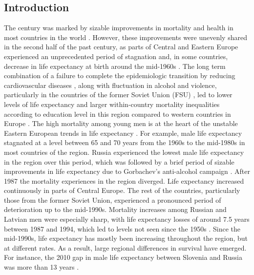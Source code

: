\documentclass{article}
\begin{document}
\begin{spacing}{1.5}
\section*{Introduction}
The  century was marked by sizable improvements in mortality and health in most countries in the world \citep{who2000}. However, these improvements were unevenly shared in the second half of the past century, as parts of Central and Eastern Europe experienced an unprecedented period of stagnation and, in some countries, decrease in life expectancy at birth around  the mid-1960s \citep{HMD}. The long term combination of a failure to complete the epidemiologic transition by reducing cardiovascular diseases \citep{caselli2002epidemiologic}, along with fluctuation in alcohol and violence, particularly in the countries of the former Soviet Union (FSU) \citep{bye2008alcohol,leon1997huge}, led to lower levels of life expectancy and larger within-country mortality inequalities according to education level in this region compared to western countries in Europe \citep{mackenbach2008socioeconomic}. The high mortality among young men is at the heart of the unstable Eastern European trends in life expectancy \citep{mckee2001}. For example, male life expectancy stagnated at a level between 65 and 70 years from the 1960s to the mid-1980s in most countries of the region. Russia experienced the lowest male life expectancy in the region over this period, which was followed by a brief period of sizable improvements in life expectancy due to Gorbachev's anti-alcohol campaign \citep{leon1998social}. After 1987 the mortality experiences in the region diverged. Life expectancy increased continuously in parts of Central Europe. The rest of the countries, particularly those from the former Soviet Union, experienced a pronounced period of deterioration up to the mid-1990s. Mortality increases among Russian and Latvian men were especially sharp, with life expectancy losses of around 7.5 years between 1987 and 1994, which led to levels not seen since the 1950s \citep{shkolnikov2001}. Since the mid-1990s, life expectancy has mostly been increasing throughout the region, but at different rates. As a result, large regional differences in survival have emerged. For instance, the 2010 gap in male life expectancy between Slovenia and Russia was more than 13 years \citep{HMD}.\\


\end{spacing}
\end{document}
